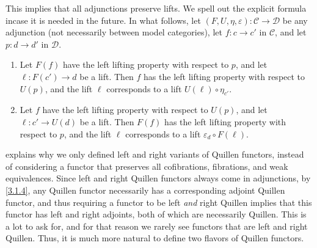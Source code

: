 \begin{remark}\label{3.1.5}
	This implies that all adjunctions preserve lifts. We spell out the explicit formula incase it is needed in the future. In what follows, let $(F,U,\eta,\varepsilon ): \mathcal{C}  \to \mathcal{D} $ be any adjunction (not necessarily between model categories), let $f : c \to c'$ in $\mathcal{C} $, and let $p : d \to d'$ in $\mathcal{D} $.
	\begin{enumerate}
		\item Let $F(f)$ have the left lifting property with respect to $p$, and let $\ell : F(c') \to d$ be a lift. Then $f$ has the left lifting property with respect to $U(p)$, and the lift $\ell $ corresponds to a lift $U(\ell )\circ \eta_{c'} $.
		\item Let $f$ have the left lifting property with respect to $U(p)$, and let $\ell : c' \to U(d)$ be a lift. Then $F(f)$ has the left lifting property with respect to $p$, and the lift $\ell $ corresponds to a lift $\varepsilon_d \circ F(\ell )$.
	\end{enumerate}	
\end{remark}

\begin{remark}\label{3.1.6}
	 explains why we only defined left and right variants of Quillen functors, instead of considering a functor that preserves all cofibrations, fibrations, and weak equivalences. Since left and right Quillen functors always come in adjunctions, by \cref{3.1.4}, any Quillen functor necessarily has a corresponding adjoint Quillen functor, and thus requiring a functor to be left \emph{and} right Quillen implies that this functor has left and right adjoints, both of which are necessarily Quillen. This is a lot to ask for, and for that reason we rarely see functors that are left and right Quillen. Thus, it is much more natural to define two flavors of Quillen functors.
\end{remark}

